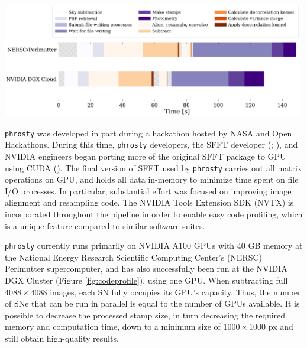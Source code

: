 \documentclass[10pt,a4paper,onecolumn]{article}
\let\origfigure\figure
\let\endorigfigure\endfigure
\renewenvironment{figure}[1][2] {
    \expandafter\origfigure\expandafter[H]
} {
    \endorigfigure
}
\begin{document}
\label{sec:gpu}

\begin{figure}
   \centering
   \includegraphics[width=0.99\textwidth]{codeprofiles.pdf}
   \caption{Run times gathered through NVIDIA Nsight Systems profiling for `phrosty`, run on the NVIDIA Curiosity and NERSC Perlmutter clusters. Each profile shows the end-to-end processing of two OpenUniverse images containing SN 20172782. Color bars represent functions in `phrosty`, including calls to external libraries. The grey hatched areas are other computing processes.}
   \label{fig:codeprofile}
\end{figure}

\texttt{phrosty} was developed in part during a hackathon hosted by NASA
and Open Hackathons. During this time, \texttt{phrosty} developers, the
SFFT developer (;
), and NVIDIA engineers began
porting more of the original SFFT package to GPU using CUDA
(). The final version of SFFT
used by \texttt{phrosty} carries out all matrix operations on GPU, and
holds all data in-memory to minimize time spent on file I/O processes.
In particular, substantial effort was focused on improving image
alignment and resampling code. The NVIDIA Tools Extension SDK (NVTX) is
incorporated throughout the pipeline in order to enable easy code
profiling, which is a unique feature compared to similar software
suites.

\texttt{phrosty} currently runs primarily on NVIDIA A100 GPUs with 40 GB
memory at the National Energy Research Scientific Computing Center's
(NERSC) Perlmutter supercomputer, and has also successfully been run at
the NVIDIA DGX Cluster (Figure \ref{fig:codeprofile}), using one GPU.
When subtracting full \(4088 \times 4088\) images, each SN fully
occupies its GPU's capacity. Thus, the number of SNe that can be run in
parallel is equal to the number of GPUs available. It is possible to
decrease the processed stamp size, in turn decreasing the required
memory and computation time, down to a minimum size of
\(1000\times1000\) px and still obtain high-quality results.
\end{document}
